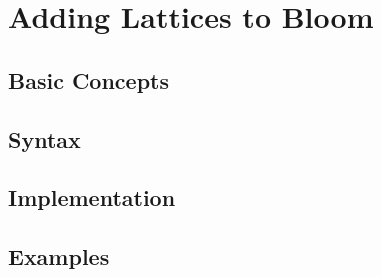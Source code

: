 \section{Adding Lattices to Bloom}
\label{sec:impl}

\subsection{Basic Concepts}

\subsection{Syntax}

\subsection{Implementation}

\subsection{Examples}

